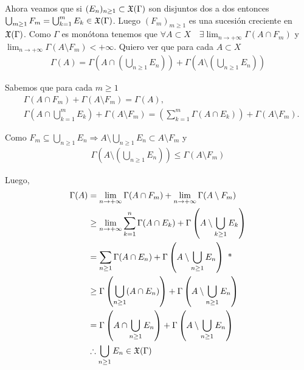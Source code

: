 Ahora veamos que si $(E_n)_{n \geq 1} \subset \mathfrak{X}(\Gamma)$ son disjuntos dos a dos entonces $\bigcup_{m \geq 1} F_m = \bigcup_{k = 1}^m E_k \in \mathfrak{X}(\Gamma)$. Luego $(F_m)_{m \geq 1}$ es una sucesión
creciente en $\mathfrak{X}(\Gamma)$. Como $\Gamma$ es monótona tenemos que $\forall A \subset X \quad \exists \lim_{n \to +\infty} \Gamma(A \cap F_m)$ y $\lim_{n \to +\infty} \Gamma(A \setminus F_m) < +\infty$.
Quiero ver que para cada $A \subset X$ \begin{align*}
    \Gamma(A) = \Gamma\left(A \cap \left(\bigcup_{n \geq 1} E_n\right)\right) + \Gamma\left(A \setminus \left(\bigcup_{n \geq 1} E_n\right) \right)
\end{align*}

Sabemos que para cada $m \geq 1$
\begin{align*}
     & \Gamma(A \cap F_m) + \Gamma(A \setminus F_m) = \Gamma(A),                                                                                          \\
     & \Gamma\left(A \cap \bigcup_{k=1}^m E_k\right) + \Gamma(A \setminus F_m) = \left(\sum_{k=1}^m \Gamma(A \cap E_k) \right) + \Gamma(A \setminus F_m).
\end{align*}

Como $F_m \subseteq \bigcup_{n \geq 1} E_n \Rightarrow A \setminus \bigcup_{n \geq 1} E_n \subset A \setminus F_m$ y \begin{align*}
    \Gamma\left(A \setminus \left(\bigcup_{n \geq 1} E_n \right)\right) \leq \Gamma(A \setminus F_m)
\end{align*}

Luego, \begin{align*}
    \Gamma(A) & = \lim_{n \to +\infty} \Gamma(A \cap F_m) + \lim_{n \to +\infty} \Gamma(A \setminus F_m)                            \\
              & \geq \lim_{n \to +\infty} \sum_{k = 1}^n \Gamma(A \cap E_k) + \Gamma\left(A \setminus \bigcup_{k \geq 1} E_k\right) \\
              & = \sum_{n \geq 1} \Gamma(A \cap E_n) + \Gamma\left(A \setminus \bigcup_{n \geq 1} E_n \right) \text{ *}             \\
              & \geq \Gamma\left(\bigcup_{n \geq 1} (A \cap E_n)\right) + \Gamma\left(A \setminus \bigcup_{n \geq 1} E_n \right)    \\
              & = \Gamma\left(A \cap \bigcup_{n \geq 1} E_n\right) + \Gamma\left(A \setminus \bigcup_{n \geq 1} E_n \right)         \\
              & \therefore \bigcup_{n \geq 1} E_n \in \mathfrak{X}(\Gamma)
\end{align*}

